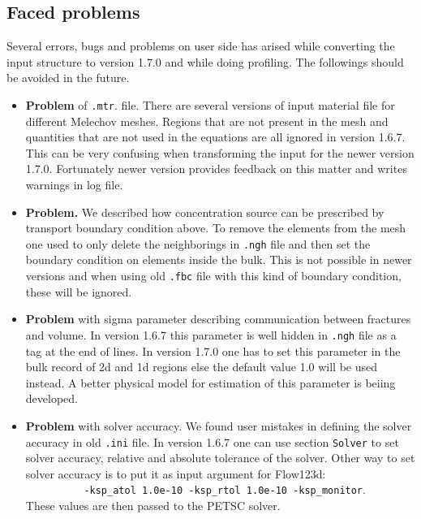 \subsection{Faced problems}
Several errors, bugs and problems on user side has arised while converting the 
input structure to version 1.7.0 and while doing profiling. The followings should be avoided in the future.

\begin{itemize}
  \item \textbf{Problem} of \verb'.mtr'. file. There are several versions of input material file for 
        different Melechov meshes. Regions that are not present in the mesh and quantities that are not used in
        the equations are all ignored in version 1.6.7. This can be very confusing when transforming the input
        for the newer version 1.7.0. Fortunately newer version provides feedback on this matter and writes
        warnings in log file.

  \item \textbf{Problem.} We described how concentration source can be prescribed by transport boundary condition above.
        To remove the elements from the mesh one used to only delete the neighborings in \verb'.ngh' file and then
        set the boundary condition on elements inside the bulk. This is not possible in newer versions and when using
        old \verb'.fbc' file with this kind of boundary condition, these  will be ignored.
  
  \item \textbf{Problem} with sigma parameter describing communication between fractures and volume.
        In version 1.6.7 this parameter is well hidden in \verb'.ngh' file as a tag at the end of
        lines. In version 1.7.0 one has to set this parameter in the bulk record of 2d and 1d regions 
        else the default value 1.0 will be used instead. A better physical model for estimation of this 
        parameter is beiing developed.

  \item \textbf{Problem} with solver accuracy. We found user mistakes in defining the solver accuracy in 
        old \verb'.ini' file. In version 1.6.7 one can use section \verb'Solver' to set solver accuracy,
        relative and absolute tolerance of the solver. Other way to set solver accuracy is to put it as
        input argument for Flow123d: \\
        \verb'          -ksp_atol 1.0e-10 -ksp_rtol 1.0e-10 -ksp_monitor'. \\
        These values are then passed to the PETSC solver.
        
  

\end{itemize}
